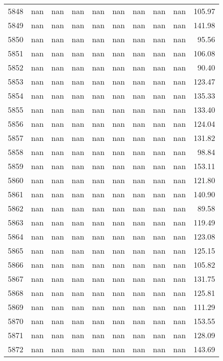 \begin{tabular}{lrrrrrrrrr}
5848 & nan & nan & nan & nan & nan & nan & nan & nan & 105.97 \\
5849 & nan & nan & nan & nan & nan & nan & nan & nan & 141.98 \\
5850 & nan & nan & nan & nan & nan & nan & nan & nan & 95.56 \\
5851 & nan & nan & nan & nan & nan & nan & nan & nan & 106.08 \\
5852 & nan & nan & nan & nan & nan & nan & nan & nan & 90.40 \\
5853 & nan & nan & nan & nan & nan & nan & nan & nan & 123.47 \\
5854 & nan & nan & nan & nan & nan & nan & nan & nan & 135.33 \\
5855 & nan & nan & nan & nan & nan & nan & nan & nan & 133.40 \\
5856 & nan & nan & nan & nan & nan & nan & nan & nan & 124.04 \\
5857 & nan & nan & nan & nan & nan & nan & nan & nan & 131.82 \\
5858 & nan & nan & nan & nan & nan & nan & nan & nan & 98.84 \\
5859 & nan & nan & nan & nan & nan & nan & nan & nan & 153.11 \\
5860 & nan & nan & nan & nan & nan & nan & nan & nan & 121.80 \\
5861 & nan & nan & nan & nan & nan & nan & nan & nan & 140.90 \\
5862 & nan & nan & nan & nan & nan & nan & nan & nan & 89.58 \\
5863 & nan & nan & nan & nan & nan & nan & nan & nan & 119.49 \\
5864 & nan & nan & nan & nan & nan & nan & nan & nan & 123.08 \\
5865 & nan & nan & nan & nan & nan & nan & nan & nan & 125.15 \\
5866 & nan & nan & nan & nan & nan & nan & nan & nan & 105.82 \\
5867 & nan & nan & nan & nan & nan & nan & nan & nan & 131.75 \\
5868 & nan & nan & nan & nan & nan & nan & nan & nan & 125.81 \\
5869 & nan & nan & nan & nan & nan & nan & nan & nan & 111.29 \\
5870 & nan & nan & nan & nan & nan & nan & nan & nan & 153.55 \\
5871 & nan & nan & nan & nan & nan & nan & nan & nan & 128.09 \\
5872 & nan & nan & nan & nan & nan & nan & nan & nan & 143.69 \\

\end{tabular}
